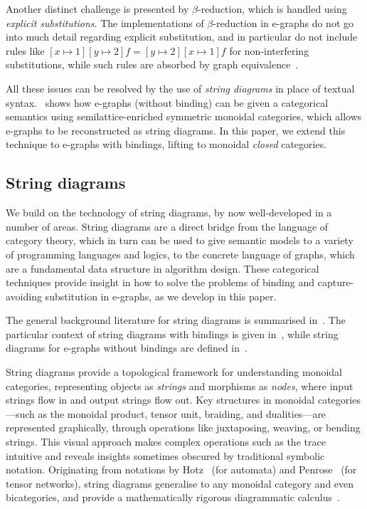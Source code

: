 Another distinct challenge is presented by $\beta$-reduction, which is handled using \emph{explicit substitutions}. 
The implementations of $\beta$-reduction in e-graphs do not go into much detail regarding explicit substitution, and in particular do not include rules like $[x\!\mapsto\!1][y\!\mapsto\!2]f\!=\![y\!\mapsto\!2][x\!\mapsto\!1]f$ for non-interfering substitutions, while such rules are absorbed by graph equivalence~\cite{accattoli2014nonstandard}.

All these issues can be resolved by the use of \emph{string diagrams} in place of textual syntax.
\cite{ghica2024equivalencehypergraphsegraphsmonoidal}~shows how e-graphs (without binding) can be given a categorical semantics using semilattice-enriched symmetric monoidal categories, which allows e-graphs to be reconstructed as string diagrams.
In this paper, we extend this technique to e-graphs with bindings, lifting to monoidal \emph{closed} categories.

\subsection{String diagrams}

We build on the technology of string diagrams, by now well-developed in a number of areas. 
String diagrams are a direct bridge from the language of category theory, which in turn can be used to give semantic models to a variety of programming languages and logics, to the concrete language of graphs, which are a fundamental data structure in algorithm design.
These categorical techniques provide insight in how to solve the problems of binding and capture-avoiding substitution in e-graphs, as we develop in this paper.

The general background literature for string diagrams is summarised in~\cite{piedeleu2023introductionstringdiagramscomputer}.
The particular context of string diagrams with bindings is given in~\cite{ghica2024stringdiagramslambdacalculifunctional}, while string diagrams for e-graphs without bindings are defined in~\cite{ghica2024equivalencehypergraphsegraphsmonoidal}.

String diagrams provide a topological framework for understanding monoidal categories, representing objects as \emph{strings} and morphisms as \emph{nodes}, where input strings flow in and output strings flow out. 
Key structures in monoidal categories---such as the monoidal product, tensor unit, braiding, and dualities---are represented graphically, through operations like juxtaposing, weaving, or bending strings. 
This visual approach makes complex operations such as the trace intuitive and reveals insights sometimes obscured by traditional symbolic notation. 
Originating from notations by Hotz~\cite{hotzsd} (for automata) and Penrose~\cite{penrose1984spinors} (for tensor networks), string diagrams generalise to any monoidal category and even bicategories, and provide a mathematically rigorous diagrammatic calculus~\cite{joyal_geometry_1991}.

